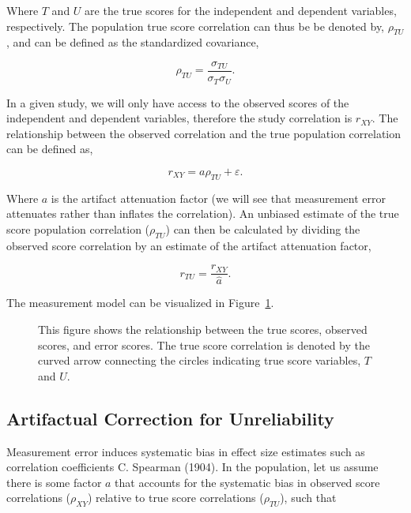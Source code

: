 \documentclass[
  letterpaper,
  DIV=11,
  numbers=noendperiod]{scrreprt}
\begin{document}
Where \(T\) and \(U\) are the true scores for the independent and
dependent variables, respectively. The population true score correlation
can thus be be denoted by, \(\rho_{TU}\), and can be defined as the
standardized covariance,

\[
\rho_{TU} = \frac{\sigma_{TU}}{\sigma_{T}\sigma_{U}}.
\]

In a given study, we will only have access to the observed scores of the
independent and dependent variables, therefore the study correlation is
\(r_{XY}\). The relationship between the observed correlation and the
true population correlation can be defined as,

\[
r_{XY} = a\rho_{TU} + \varepsilon.
\]

Where \(a\) is the artifact attenuation factor (we will see that
measurement error attenuates rather than inflates the correlation). An
unbiased estimate of the true score population correlation
(\(\rho_{TU}\)) can then be calculated by dividing the observed score
correlation by an estimate of the artifact attenuation factor,

\[
r_{TU} = \frac{r_{XY}}{\hat{a}}.
\]

The measurement model can be visualized in Figure~\ref{fig-corr-model}.

\begin{figure}[H]


\caption{\label{fig-corr-model}This figure shows the relationship
between the true scores, observed scores, and error scores. The true
score correlation is denoted by the curved arrow connecting the circles
indicating true score variables, \(T\) and \(U\).}

\end{figure}%

\subsection{Artifactual Correction for Unreliability}\label{sec-r-corr}

Measurement error induces systematic bias in effect size estimates such
as correlation coefficients C. Spearman (1904). In the population, let
us assume there is some factor \(a\) that accounts for the systematic
bias in observed score correlations (\(\rho_{XY}\)) relative to true
score correlations (\(\rho_{TU}\)), such that
\end{document}
